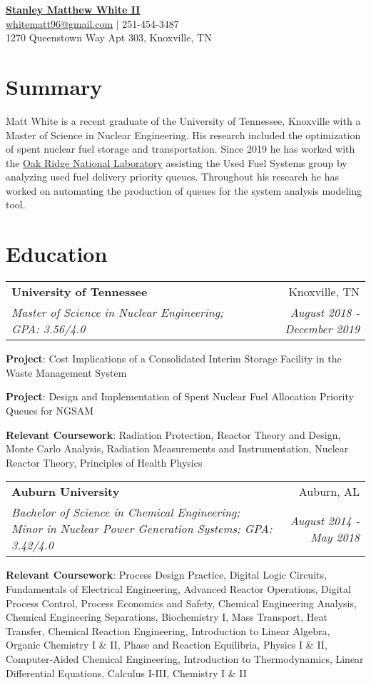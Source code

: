 \documentclass[letterpaper,10pt]{article}
\makeatletter
\newcommand{\resumeItemNoBullet}[2]{
  \item[]\small{
    \hspace{-9pt}\textbf{#1}{: #2 \vspace{-6pt}}
  }
}
\newcommand{\resumeSubheading}[4]{
  \vspace{-1pt}\item[]
  \begin{tabular*}{0.98\textwidth}{l@{\extracolsep{\fill}}r}
      \hspace{-10pt}\textbf{#1} & #2 \\
      \hspace{-10pt}\textit{\small#3} & \textit{\small #4} \\
    \end{tabular*}\vspace{-5pt}
}
\newcommand{\resumeSubHeadingListStart}{\begin{itemize}[leftmargin=*]}
\newcommand{\resumeSubHeadingListEnd}{\end{itemize}}
\newcommand{\shorterSection}[1]{\vspace{-10pt}\section{#1}}
\makeatother
\begin{document}
\begin{center}
  \small \textbf{\href{abhoi.github.io}{\huge Stanley Matthew White II}} \\ 
  \vspace{1mm}
  \href{mailto:whitematt96@gmail.com}{\color{blue}\underline{whitematt96@gmail.com}} $\vert$
  251-454-3487 \\
  \vspace{1mm}
  \small 1270 Queenstown Way Apt 303, Knoxville, TN
\end{center}

\shorterSection{Summary}
\vspace{4pt}
Matt White is a recent graduate of the University of Tennessee, Knoxville with a Master of Science in Nuclear Engineering. His research included the optimization of spent nuclear fuel storage and transportation. Since 2019 he has worked with the \href{https://www.ornl.gov/}{{\color{blue}Oak Ridge National Laboratory}} assisting the Used Fuel Systems group by analyzing used fuel delivery priority queues. Throughout his research he has worked on automating the production of queues for the system analysis modeling tool.
     \vspace{10pt}

\shorterSection{Education}
  \resumeSubHeadingListStart
    \resumeSubheading
      {University of Tennessee}{Knoxville, TN}
      {Master of Science in Nuclear Engineering;  GPA: 3.56/4.0}{August 2018 - December 2019}{
      \resumeItemNoBullet{Project}{Cost Implications of a Consolidated Interim Storage Facility in the Waste Management System}
      \resumeItemNoBullet{Project}{Design and Implementation of Spent Nuclear Fuel Allocation Priority Queues for NGSAM}
      \resumeItemNoBullet{Relevant Coursework}{Radiation Protection, Reactor Theory and Design, Monte Carlo Analysis, Radiation Measurements and Instrumentation,
      Nuclear Reactor Theory, Principles of Health Physics}
      }
    \resumeSubheading
      {Auburn University}{Auburn, AL}
      {Bachelor of Science in Chemical Engineering; Minor in Nuclear Power Generation Systems;  GPA: 3.42/4.0 }{August 2014 - May 2018}
       \resumeItemNoBullet{Relevant Coursework}{Process Design Practice, Digital Logic Circuits, Fundamentals of Electrical Engineering, Advanced Reactor Operations, Digital Process Control, Process Economics and Safety, Chemical Engineering Analysis, Chemical Engineering Separations, Biochemistry I, Mass Transport, Heat Transfer, Chemical Reaction Engineering, Introduction to Linear Algebra, Organic Chemistry I \& II, Phase and Reaction Equilibria, Physics I \& II, Computer-Aided Chemical Engineering, Introduction to Thermodynamics, Linear Differential Equations, Calculus I-III, Chemistry I \& II}
  \resumeSubHeadingListEnd
\end{document}
